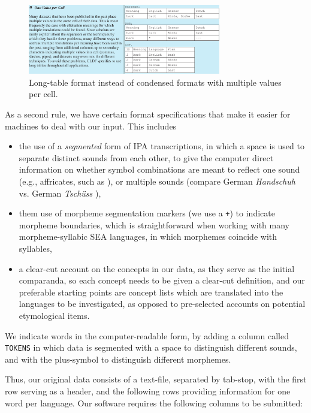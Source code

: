 \documentclass[xetex,svgnames]{scrartcl}
\begin{document}
\begin{figure}[htb]
  \centering
  \includegraphics[width=0.75\textwidth]{one-value-per-cell.png}
  \caption{Long-table format instead of condensed formats with multiple values per cell.}
  \label{fig:onevalue}
\end{figure}

As a second rule, we have certain format specifications that make it easier for machines to deal
with our input. This includes

\begin{itemize}
  \item the use of a \emph{segmented} form of IPA transcriptions, in which a space is used to
    separate distinct sounds from each other, to give the computer direct information on whether
    symbol combinations are meant to reflect one sound (e.g., affricates, such as {\sil [ts, tʃ]}),
    or multiple sounds (compare German \emph{Handschuh} {\sil [h a n t ʃ uː]} vs. German
    \emph{Tschüss} {\sil [tʃ y s]}),
  \item them use of morpheme segmentation markers (we use a \texttt{+}) to indicate morpheme
    boundaries, which is straightforward when working with many morpheme-syllabic SEA languages, in
    which morphemes coincide with syllables,
  \item a clear-cut account on the concepts in our data, as they serve as the initial comparanda, so
    each concept needs to be given a clear-cut definition, and our preferable starting points are
    concept lists which are translated into the languages to be investigated, as opposed to
    pre-selected accounts on potential etymological items.

\end{itemize}

We indicate words in the computer-readable form, by adding a column called \texttt{TOKENS} in which
data is segmented with a space to distinguish different sounds, and with the plus-symbol to
distinguish different morphemes.

Thus, our original data consists of a text-file, separated by tab-stop, with the first row serving as
a header, and the following rows providing information for one word per language. Our software
requires the following columns to be submitted:
\end{document}
